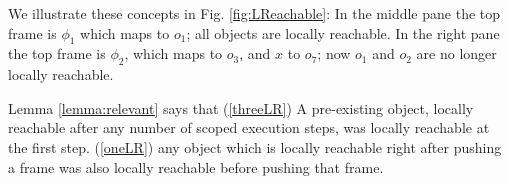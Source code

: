 {{We illustrate these concepts in Fig. \ref{fig:LReachable}:  In the middle pane the top frame is $\phi_1$ which maps  to $o_1$; all objects are locally reachable. 
In the right pane the top frame is $\phi_2$, which maps  to $o_3$, and $x$ to $o_7$; now $o_1$ and $o_2$ are no longer locally reachable.

Lemma  \ref{lemma:relevant} %
says that 
(\ref{threeLR}) A pre-existing object, locally reachable after any number of scoped execution steps, was locally reachable at the first step.
(\ref{oneLR}) any object which is locally reachable right after pushing a frame was also locally reachable before pushing that frame.

}}
